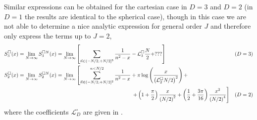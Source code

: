 Similar expressions can be obtained for the cartesian case in $D=3$ and $D=2$ (in $D=1$ the results are identical to the spherical case), though in this case we are not able to determine a nice analytic expression for general order $J$ and therefore only express the terms up to $J=2$,
\begin{align}
    S_3^\cartesian(x)  = \lim_{N\goesto\infty} S^{\cartesian N}_3(x)
    &=
    \lim_{N\goesto\infty}\left[\sum_{\vec{n} \in (-N/2, +N/2]^3} \frac{1}{n^2-x}
        -\mathcal{L}^\square_3 \frac{N}{2}+ ???
    \right]
    &
    (D&=3)
    \nonumber\\
    S_2^\cartesian(x)  = \lim_{N\goesto\infty} S^{\cartesian N}_2(x)
    &=
    \lim_{N\goesto\infty}\left[\sum_{\vec{n} \in (-N/2, +N/2]^2}^{n<N/2} \frac{1}{n^2-x}
        + \pi \log\left( \frac{x}{\left(\mathcal{L}^\square_2N/2\right)^2}\right)+%
        \right. \\
        &\hspace{5cm}\left.+\left(1+\frac{\pi}{2}\right)\frac{x}{\left(N/2\right)^2}+\left(\frac{1}{2}+\frac{3 \pi }{16}\right)\frac{x^2}{\left(N/2\right)^4}
    \right]
    &
    (D&=2)\nonumber
\end{align}
where the coefficients $\mathcal{L}^\square_D$ are given in  . %


